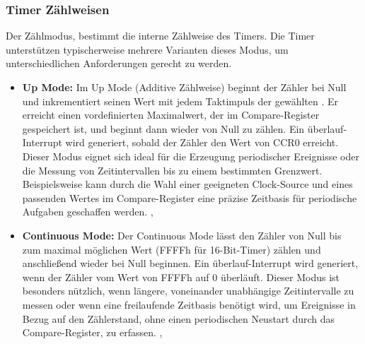 \subsubsection{Timer Zählweisen}
\label{Timer_CountMode}

Der Z\"ahlmodus, bestimmt die interne Z\"ahlweise des Timers. Die Timer unterst\"utzen typischerweise mehrere Varianten dieses Modus, um unterschiedlichen Anforderungen gerecht zu werden.

\begin{itemize}
	\item \textbf{Up Mode:} Im Up Mode (Additive Z\"ahlweise) beginnt der Z\"ahler bei Null und inkrementiert seinen Wert mit jedem Taktimpuls der gew\"ahlten . Er erreicht einen vordefinierten Maximalwert, der im Compare-Register gespeichert ist, und beginnt dann wieder von Null zu z\"ahlen. Ein \"uberlauf-Interrupt wird generiert, sobald der Z\"ahler den Wert von CCR0 erreicht. Dieser Modus eignet sich ideal f\"ur die Erzeugung periodischer Ereignisse oder die Messung von Zeitintervallen bis zu einem bestimmten Grenzwert. Beispielsweise kann durch die Wahl einer geeigneten Clock-Source und eines passenden Wertes im Compare-Register eine pr\"azise Zeitbasis f\"ur periodische Aufgaben geschaffen werden. ,
	
	\item \textbf{Continuous Mode:} Der Continuous Mode l\"asst den Z\"ahler von Null bis zum maximal m\"oglichen Wert (FFFFh f\"ur 16-Bit-Timer) z\"ahlen und anschlie{\ss}end wieder bei Null beginnen. Ein \"uberlauf-Interrupt wird generiert, wenn der Z\"ahler vom Wert von FFFFh auf 0 \"uberl\"auft.  Dieser Modus ist besonders n\"utzlich, wenn l\"angere, voneinander unabh\"angige Zeitintervalle zu messen oder wenn eine freilaufende Zeitbasis ben\"otigt wird, um Ereignisse in Bezug auf den Z\"ahlerstand, ohne einen periodischen Neustart durch das Compare-Register, zu erfassen. , 


\end{itemize}
